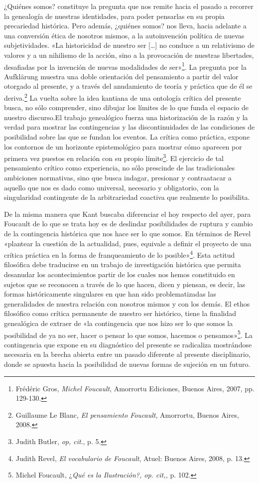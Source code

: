 ¿Quiénes somos? constituye la pregunta que nos remite hacia el pasado a recorrer la genealogía de nuestras identidades, para poder pensarlas en su propia precariedad histórica. Pero además, ¿quiénes somos? nos lleva, hacia adelante a una conversión ética de nosotros mismos, a la autoinvención política de nuevas subjetividades. «La historicidad de nuestro ser {[}\ldots{]} no conduce a un relativismo de valores y a un nihilismo de la acción, sino a la provocación de nuestras libertades, desafiadas por la invención de nuevas modalidades de ser»\footnote{Frédéric Gros, \emph{Michel Foucault}, Amorrortu Ediciones, Buenos Aires, 2007, pp. 129-130.}. La pregunta por la Aufklärung muestra una doble orientación del pensamiento a partir del valor otorgado al presente, y a través del anudamiento de teoría y práctica que de él se deriva.\footnote{Guillaume Le Blanc, \emph{El pensamiento Foucault}, Amorrortu, Buenos Aires, 2008.} La vuelta sobre la idea kantiana de una ontología crítica del presente busca, no sólo comprender, sino dibujar los límites de lo que funda el espacio de nuestro discurso.El trabajo genealógico fuerza una historización de la razón y la verdad para mostrar las contingencias y las discontinuidades de las condiciones de posibilidad sobre las que se fundan los eventos. La crítica como práctica, expone los contornos de un horizonte epistemológico para mostrar cómo aparecen por primera vez puestos en relación con su propio límite\footnote{Judith Butler, \emph{op, cit}., p. 5.}. El ejercicio de tal pensamiento crítico como experiencia, no sólo prescinde de las tradicionales ambiciones normativas, sino que busca indagar, presionar y contraatacar a aquello que nos es dado como universal, necesario y obligatorio, con la singularidad contingente de la arbitrariedad coactiva que realmente lo posibilita.

De la misma manera que Kant buscaba diferenciar el hoy respecto del ayer, para Foucault de lo que se trata hoy es de deslindar posibilidades de ruptura y cambio de la contingencia histórica que nos hace ser lo que somos. En términos de Revel «plantear la cuestión de la actualidad, pues, equivale a definir el proyecto de una crítica práctica en la forma de franqueamiento de lo posible»\footnote{Judith Revel, \emph{El vocabulario de Foucault}, Atuel: Buenos Aires, 2008, p. 13.}. Esta actitud filosófica debe traducirse en un trabajo de investigación histórica que permita desanudar los acontecimientos partir de los cuales nos hemos constituido en sujetos que se reconocen a través de lo que hacen, dicen y piensan, es decir, las formas históricamente singulares en que han sido problematizadas las generalidades de nuestra relación con nosotros mismos y con los demás. El ethos filosófico como crítica permanente de nuestro ser histórico, tiene la finalidad genealógica de extraer de «la contingencia que nos hizo ser lo que somos la posibilidad de ya no ser, hacer o pensar lo que somos, hacemos o pensamos»\footnote{Michel Foucault, ¿\emph{Qué es la Ilustración?, op. cit,,} p. 102.}. La contingencia que expone en su diagnóstico del presente se radicaliza mostrándose necesaria en la brecha abierta entre un pasado diferente al presente disciplinario, donde se apuesta hacia la posibilidad de nuevas formas de sujeción en un futuro.

